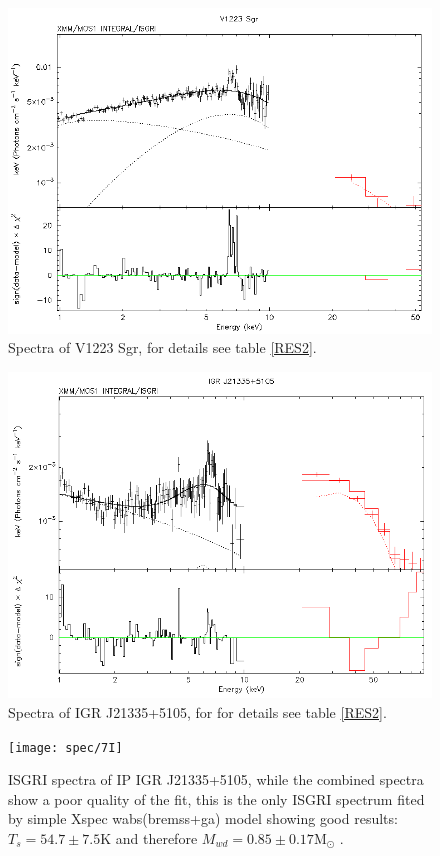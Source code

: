 \documentclass[oneside,a4paper,11pt]{report}
\begin{document}
\begin{figure}[!hbt]
\centering
\includegraphics[totalheight=8cm]{spec/6}
\caption{Spectra of V1223 Sgr, for details see table \ref{RES2}. }
\label{sp6} 
\end{figure}


\begin{figure}[!hbt]
\centering
\includegraphics[totalheight=8cm]{spec/7}
\caption{Spectra of IGR J21335+5105, for for details see table \ref{RES2}. }
\label{sp7} 
\end{figure}

\begin{figure}[!hbt]
\centering
\texttt{[image: spec/7I]}
\caption{ISGRI spectra of IP IGR J21335+5105, while the combined spectra show a poor quality of the fit, this is the only ISGRI spectrum fited by simple Xspec wabs(bremss+ga) model
showing good results: $T_s = 54.7 \pm 7.5 \mathrm{K}$ and therefore $M_{wd} = 0.85 \pm 0.17 \mathrm{M_{\odot}}$ . }
\label{sp7I} 
\end{figure}
\end{document}
